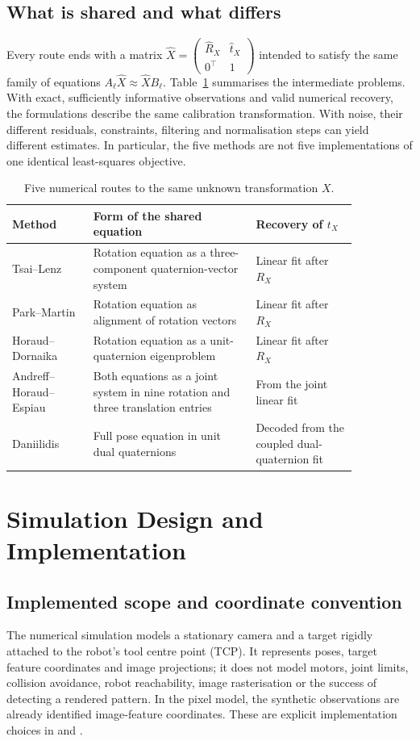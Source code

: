 \documentclass[12pt,a4paper]{article}
\newcommand{\code}[1]{\texttt{\detokenize{#1}}}
\begin{document}
\clearpage
\subsection{What is shared and what differs}
Every route ends with a matrix $\widehat X=\left(\begin{smallmatrix}\widehat R_X&\widehat t_X\\0^\top&1\end{smallmatrix}\right)$ intended to satisfy the same family of equations $A_\ell\widehat X\approx\widehat XB_\ell$. Table~\ref{tab:method-routes} summarises the intermediate problems. With exact, sufficiently informative observations and valid numerical recovery, the formulations describe the same calibration transformation. With noise, their different residuals, constraints, filtering and normalisation steps can yield different estimates. In particular, the five methods are not five implementations of one identical least-squares objective. \cite{opencv,opencvsource}

\begin{table}[!htbp]\centering\small
\caption{Five numerical routes to the same unknown transformation $X$.}\label{tab:method-routes}
\begin{tabular}{p{0.20\linewidth}p{0.40\linewidth}p{0.25\linewidth}}\toprule
Method & Form of the shared equation & Recovery of $t_X$\\\midrule
Tsai--Lenz & Rotation equation as a three-component quaternion-vector system & Linear fit after $R_X$\\
Park--Martin & Rotation equation as alignment of rotation vectors & Linear fit after $R_X$\\
Horaud--Dornaika & Rotation equation as a unit-quaternion eigenproblem & Linear fit after $R_X$\\
Andreff--Horaud--Espiau & Both equations as a joint system in nine rotation and three translation entries & From the joint linear fit\\
Daniilidis & Full pose equation in unit dual quaternions & Decoded from the coupled dual-quaternion fit\\\bottomrule
\end{tabular}
\end{table}

\clearpage
\section{Simulation Design and Implementation}\label{sec:simulation}
\subsection{Implemented scope and coordinate convention}
The numerical simulation models a stationary camera and a target rigidly attached to the robot's tool centre point (TCP). It represents poses, target feature coordinates and image projections; it does not model motors, joint limits, collision avoidance, robot reachability, image rasterisation or the success of detecting a rendered pattern. In the pixel model, the synthetic observations are already identified image-feature coordinates. These are explicit implementation choices in \code{benchmark.py} and \code{laboratory.py}. \cite{experimentcode}
\end{document}
